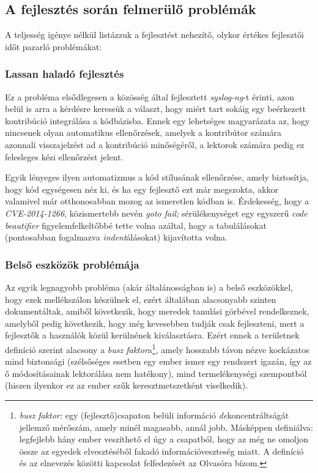 \subsection{A fejlesztés során felmerülő problémák}

A teljesség igénye nélkül listázzuk a fejlesztést nehezítő, olykor értékes fejlesztői időt pazarló
problémákat:

\subsubsection{Lassan haladó fejlesztés}
Ez a probléma elsődlegesen a közösség által fejlesztett \emph{syslog-ng}-t érinti, azon belül is
arra a kérdésre keressük a választ, hogy miért tart sokáig egy beérkezett kontribúció integrálása
a kódbázisba. Ennek egy lehetséges magyarázata az, hogy nincsenek olyan automatikus ellenőrzések,
amelyek a kontribútor számára azonnali visszajelzést ad a kontribúció minőségéről, a lektorok
számára pedig ez felesleges kézi ellenőrzést jelent.

Egyik lényeges ilyen automatizmus a kód stílusának ellenőrzése, amely biztosítja, hogy kód
egységesen néz ki, és ha egy fejlesztő ezt már megszokta, akkor valamivel már otthonosabban mozog az
ismeretlen kódban is.  Érdekesség, hogy a \emph{CVE-2014-1266}\cite{cve20141266}, közismertebb nevén
\emph{goto fail;} sérülékenységet egy egyszerű \emph{code beautifier} figyelemfelkeltőbbé tette
volna azáltal, hogy a tabulálásokat (pontosabban fogalmazva \emph{indent}álásokat) kijavította
volna.

\subsubsection{Belső eszközök problémája}
Az egyik legnagyobb probléma (akár általánosságban is) a belső eszközökkel, hogy ezek mellékszálon
készülnek el, ezért általában alacsonyabb szinten dokumentáltak, amiből következik, hogy meredek
tanulási görbével rendelkeznek, amelyből pedig következik, hogy még kevesebben tudják csak
fejleszteni, mert a fejlesztők a használók közül kerülnének kiválasztásra.
Ezért ennek a területnek definíció szerint alacsony a \emph{busz faktor}a\footnote{\emph{busz
faktor:} egy (fejlesztő)csapaton belüli információ \emph{de}koncentráltságát jellemző mérőszám,
amely minél magasabb, annál jobb. Másképpen definiálva: legfejlebb hány ember veszíthető el úgy
a csapatból, hogy az még ne omoljon össze az egyedek elvesztéséből fakadó információveszteség miatt.
A definíció és az elnevezés közötti kapcsolat felfedezését az Olvasóra bízom.}, amely hosszabb távon
nézve kockázatos mind biztonsági (szélsőséges esetben egy ember ismer egy rendszert igazán, így az
ő módosításainak lektorálása nem hatékony), mind termelékenységi szempontból (hiszen ilyenkor ez az
ember szűk keresztmetszetként viselkedik).

